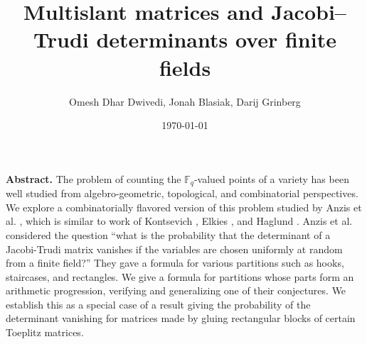 \documentclass[numbers=enddot,12pt,final,onecolumn,notitlepage]{scrartcl}%
\theoremstyle{definition}
\theoremstyle{plainsl}
\begin{document}
\title{Multislant matrices and Jacobi--Trudi determinants over finite fields}
\author{Omesh Dhar Dwivedi, Jonah Blasiak, Darij Grinberg}
\date{
\today
}
\maketitle

\textbf{Abstract.}
The problem of counting the $\mathbb{F}_q$-valued points of a variety  has been well studied from algebro-geometric, topological, and combinatorial perspectives.  We explore a combinatorially flavored version of this problem studied by Anzis et al. \cite{Anzis18}, which is similar to work of Kontsevich \cite{Kontsevich},  Elkies \cite{Elkies}, and Haglund \cite{Haglund}.
Anzis et al. considered the question ``what is the probability that the determinant of a Jacobi-Trudi matrix vanishes if the variables are chosen uniformly at random from a finite field?''
They gave a formula for various partitions such as hooks, staircases, and rectangles.
We give a formula for partitions whose parts form an arithmetic progression,
verifying and generalizing one of their conjectures.
We establish this as a special case of a result giving the probability of the determinant vanishing for matrices made by gluing rectangular blocks of certain Toeplitz matrices.
%
%
%
%
%
\end{document}
